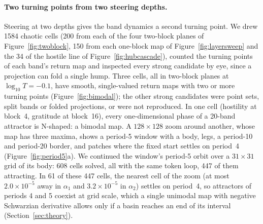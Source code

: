 \documentclass[11pt,letterpaper]{article}
\begin{document}
\paragraph{Two turning points from two steering depths.} Steering at two depths gives the band dynamics a second
turning point. We drew 1584 chaotic cells (200 from each of the four two-block planes of Figure~\ref{fig:twoblock},
150 from each one-block map of Figure~\ref{fig:layersweep} and the 34 of the hostile line of
Figure~\ref{fig:hubcascade}), counted the turning points
of each band's return map and inspected every strong candidate by eye, since a projection can fold a single hump. Three
cells, all in two-block planes at $\log_{10}T=-0.1$, have smooth, single-valued return maps with two or more turning
points (Figure~\ref{fig:bimodal}); the other strong candidates were point sets, split bands or folded projections, or
were not reproduced. In one cell (hostility at block~4, gratitude at block~16), every one-dimensional phase of a
20-band attractor is N-shaped: a bimodal map. A $128\times128$ zoom around another, whose map has three maxima, shows
a period-5 window with a body, legs, a period-10 and period-20 border, and patches where the fixed start settles on
period~4 (Figure~\ref{fig:period5}a). We continued the window's period-5 orbit over a $31\times31$ grid of its body:
608 cells solved, all with the same token loop, 447 of them attracting. In 61 of these 447 cells, the nearest cell of
the zoom (at most $2.0\times10^{-5}$ away in $\alpha_1$ and $3.2\times10^{-5}$ in $\alpha_2$) settles on period~4, so
attractors of periods 4 and 5 coexist at grid scale, which a single unimodal map with negative Schwarzian derivative
allows only if a basin reaches an end of its interval (Section~\ref{sec:theory}).
\end{document}
